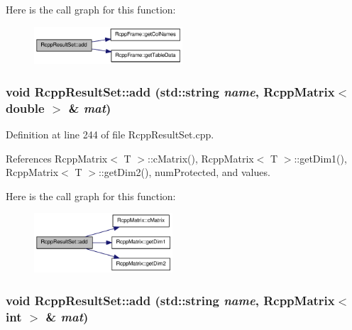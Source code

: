 Here is the call graph for this function:\nopagebreak
\begin{figure}[H]
\begin{center}
\leavevmode
\includegraphics[width=157pt]{classRcppResultSet_a9e05fb2ca92258529ffbb536e23a2a4d_cgraph}
\end{center}
\end{figure}
\hypertarget{classRcppResultSet_af6f50ca0a589fc12ef68c0406e83243b}{
\subsubsection[{add}]{\setlength{\rightskip}{0pt plus 5cm}void RcppResultSet::add (std::string {\em name}, \/  {\bf RcppMatrix}$<$ double $>$ \& {\em mat})}}
\label{classRcppResultSet_af6f50ca0a589fc12ef68c0406e83243b}


Definition at line 244 of file RcppResultSet.cpp.

References RcppMatrix$<$ T $>$::cMatrix(), RcppMatrix$<$ T $>$::getDim1(), RcppMatrix$<$ T $>$::getDim2(), numProtected, and values.

Here is the call graph for this function:\nopagebreak
\begin{figure}[H]
\begin{center}
\leavevmode
\includegraphics[width=146pt]{classRcppResultSet_af6f50ca0a589fc12ef68c0406e83243b_cgraph}
\end{center}
\end{figure}
\hypertarget{classRcppResultSet_a56f1bff720a6cf6503ab942bdb6892b3}{
\subsubsection[{add}]{\setlength{\rightskip}{0pt plus 5cm}void RcppResultSet::add (std::string {\em name}, \/  {\bf RcppMatrix}$<$ int $>$ \& {\em mat})}}
\label{classRcppResultSet_a56f1bff720a6cf6503ab942bdb6892b3}


